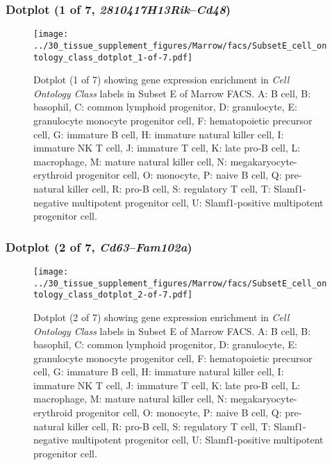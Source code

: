 \subsubsection{Dotplot (1 of 7, \emph{2810417H13Rik}--\emph{Cd48})}
\begin{figure}[h]
\centering
\texttt{[image: ../30\_tissue\_supplement\_figures/Marrow/facs/SubsetE\_cell\_ontology\_class\_dotplot\_1-of-7.pdf]}

\caption{ Dotplot (1 of 7)  showing gene expression enrichment in \emph{Cell Ontology Class} labels in Subset E of Marrow FACS. A: B cell, B: basophil, C: common lymphoid progenitor, D: granulocyte, E: granulocyte monocyte progenitor cell, F: hematopoietic precursor cell, G: immature B cell, H: immature natural killer cell, I: immature NK T cell, J: immature T cell, K: late pro-B cell, L: macrophage, M: mature natural killer cell, N: megakaryocyte-erythroid progenitor cell, O: monocyte, P: naive B cell, Q: pre-natural killer cell, R: pro-B cell, S: regulatory T cell, T: Slamf1-negative multipotent progenitor cell, U: Slamf1-positive multipotent progenitor cell.}
\end{figure}


\clearpage

\subsubsection{Dotplot (2 of 7, \emph{Cd63}--\emph{Fam102a})}
\begin{figure}[h]
\centering
\texttt{[image: ../30\_tissue\_supplement\_figures/Marrow/facs/SubsetE\_cell\_ontology\_class\_dotplot\_2-of-7.pdf]}

\caption{ Dotplot (2 of 7)  showing gene expression enrichment in \emph{Cell Ontology Class} labels in Subset E of Marrow FACS. A: B cell, B: basophil, C: common lymphoid progenitor, D: granulocyte, E: granulocyte monocyte progenitor cell, F: hematopoietic precursor cell, G: immature B cell, H: immature natural killer cell, I: immature NK T cell, J: immature T cell, K: late pro-B cell, L: macrophage, M: mature natural killer cell, N: megakaryocyte-erythroid progenitor cell, O: monocyte, P: naive B cell, Q: pre-natural killer cell, R: pro-B cell, S: regulatory T cell, T: Slamf1-negative multipotent progenitor cell, U: Slamf1-positive multipotent progenitor cell.}
\end{figure}


\clearpage

